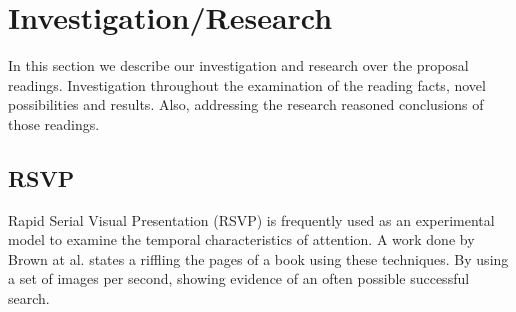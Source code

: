 \section{Investigation/Research}

In this section we describe our investigation and research over the proposal readings. Investigation throughout the examination of the reading facts, novel possibilities and results. Also, addressing the research reasoned conclusions of those readings.

\subsection{RSVP}

Rapid Serial Visual Presentation (RSVP) is frequently used as an experimental model to examine the temporal characteristics of attention. A work done by Brown at al. \cite{brown2017role} states a riffling the pages of a book using these techniques. By using a set of images per second, showing evidence of an often possible successful search.